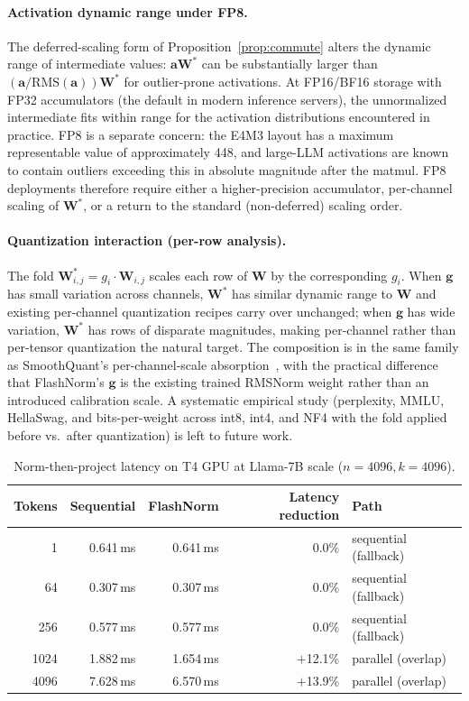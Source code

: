 \documentclass{article}
\begin{document}
\paragraph{Activation dynamic range under FP8.} The deferred-scaling form of Proposition~\ref{prop:commute} alters the dynamic range of intermediate values: $\mathbf{a}\mathbf{W}^*$ can be substantially larger than $(\mathbf{a}/\mathrm{RMS}(\mathbf{a}))\mathbf{W}^*$ for outlier-prone activations. At FP16/BF16 storage with FP32 accumulators (the default in modern inference servers), the unnormalized intermediate fits within range for the activation distributions encountered in practice. FP8 is a separate concern: the E4M3 layout has a maximum representable value of approximately 448, and large-LLM activations are known to contain outliers exceeding this in absolute magnitude after the matmul. FP8 deployments therefore require either a higher-precision accumulator, per-channel scaling of $\mathbf{W}^*$, or a return to the standard (non-deferred) scaling order.

\paragraph{Quantization interaction (per-row analysis).} The fold $\mathbf{W}^*_{i,j} = g_i \cdot \mathbf{W}_{i,j}$ scales each row of $\mathbf{W}$ by the corresponding $g_i$. When $\mathbf{g}$ has small variation across channels, $\mathbf{W}^*$ has similar dynamic range to $\mathbf{W}$ and existing per-channel quantization recipes carry over unchanged; when $\mathbf{g}$ has wide variation, $\mathbf{W}^*$ has rows of disparate magnitudes, making per-channel rather than per-tensor quantization the natural target. The composition is in the same family as SmoothQuant's per-channel-scale absorption~\citep{smoothQuant}, with the practical difference that FlashNorm's $\mathbf{g}$ is the existing trained RMSNorm weight rather than an introduced calibration scale. A systematic empirical study (perplexity, MMLU, HellaSwag, and bits-per-weight across int8, int4, and NF4 with the fold applied before vs.\ after quantization) is left to future work.

\begin{table}[h!] \centering
\caption{Norm-then-project latency on T4 GPU at Llama-7B scale ($n{=}4096, k{=}4096$).}
\label{tab:overlap7b}
\begin{tabular}{r r r r l}
\hline
Tokens & Sequential & FlashNorm & Latency reduction & Path \\
\hline
1      & 0.641\,ms & 0.641\,ms & $0.0$\% & sequential (fallback) \\
64     & 0.307\,ms & 0.307\,ms & $0.0$\% & sequential (fallback) \\
256    & 0.577\,ms & 0.577\,ms & $0.0$\% & sequential (fallback) \\
1024   & 1.882\,ms & 1.654\,ms & $+$12.1\% & parallel (overlap) \\
4096   & 7.628\,ms & 6.570\,ms & $+$13.9\% & parallel (overlap) \\
\hline
\end{tabular}
\end{table}
\end{document}
